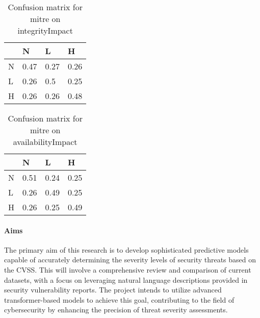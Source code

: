 \documentclass[11pt]{article}
\begin{document}
\begin{table}
	\caption{Confusion matrix for mitre on integrityImpact}
	\label{table:mitre-integrityImpact}
	\begin{center}
		\begin{tabular}{l|l|l|l}\textbf{} & \textbf{N} & \textbf{L} & \textbf{H} \\
               \hline
               N                  & 0.47       & 0.27       & 0.26       \\
               L                  & 0.26       & 0.5        & 0.25       \\
               H                  & 0.26       & 0.26       & 0.48       \\
		\end{tabular}
	\end{center}
\end{table}


\begin{table}
	\caption{Confusion matrix for mitre on availabilityImpact}
	\label{table:mitre-availabilityImpact}
	\begin{center}
		\begin{tabular}{l|l|l|l}\textbf{} & \textbf{N} & \textbf{L} & \textbf{H} \\
               \hline
               N                  & 0.51       & 0.24       & 0.25       \\
               L                  & 0.26       & 0.49       & 0.25       \\
               H                  & 0.26       & 0.25       & 0.49       \\
		\end{tabular}
	\end{center}
\end{table}


\paragraph{Aims}
The primary aim of this research is to develop sophisticated predictive models capable of accurately determining
the severity levels of security threats based on the CVSS. This will involve a comprehensive review and comparison
of current datasets, with a focus on leveraging natural language descriptions provided in security vulnerability reports.
The project intends to utilize advanced transformer-based models to achieve this goal, contributing to the field of
cybersecurity by enhancing the precision of threat severity assessments.
\end{document}
